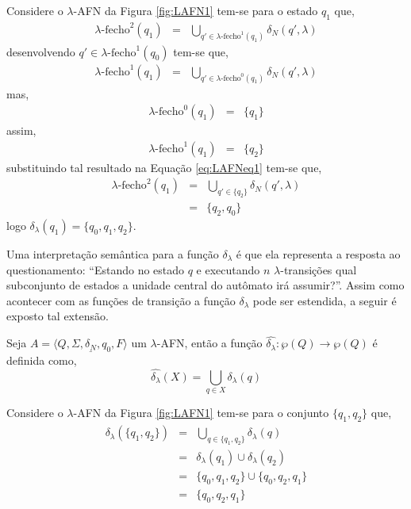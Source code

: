 \begin{example}
	Considere o $\lambda$-AFN da Figura \ref{fig:LAFN1} tem-se para o estado $q_1$ que,
	\begin{eqnarray}\label{eq:LAFNeq1}
		\lambda\text{-fecho}^{2}(q_1) & = &  \bigcup_{q' \in \lambda\text{-fecho}^{1}(q_1)} \delta_N(q', \lambda)
	\end{eqnarray}
	desenvolvendo $q' \in \lambda\text{-fecho}^{1}(q_0)$ tem-se que,
	\begin{eqnarray*}
		\lambda\text{-fecho}^{1}(q_1) & = &  \bigcup_{q' \in \lambda\text{-fecho}^{0}(q_1)} \delta_N(q', \lambda)
	\end{eqnarray*}
	mas, 
	\begin{eqnarray*}
		\lambda\text{-fecho}^{0}(q_1) & = & \{q_1\}
	\end{eqnarray*}
	assim, 
	\begin{eqnarray*}
		\lambda\text{-fecho}^{1}(q_1) & = &  \{q_2\}
	\end{eqnarray*}
	substituindo tal resultado na Equação \ref{eq:LAFNeq1} tem-se que, 
	\begin{eqnarray*}\label{eq:LAFNeq2}
		\lambda\text{-fecho}^{2}(q_1) & = & \bigcup_{q' \in \{q_2\}} \delta_N(q', \lambda)\\
		& = & \{q_2, q_0\}
	\end{eqnarray*}
	logo $\delta_\lambda(q_1) = \{q_0, q_1, q_2\}$.
\end{example}

Uma interpretação semântica para a função $\delta_\lambda$ é que ela representa a resposta ao questionamento: ``Estando no estado $q$ e executando $n$ $\lambda$-transições qual subconjunto de estados a unidade central do autômato irá assumir?''. Assim como acontecer com as funções de transição a função $\delta_\lambda$ pode ser estendida, a seguir é exposto tal extensão.

\begin{definition}\label{def:L-Fecho}
	Seja $A = \langle Q, \Sigma, \underline{\delta_N}, q_0, F\rangle$ um $\lambda$-AFN, então a função $\widehat{\delta_\lambda}: \wp(Q) \rightarrow \wp(Q)$ é definida como,
	\begin{equation}
		\widehat{\delta_\lambda}(X) = \bigcup_{q \in X} \delta_\lambda(q)
	\end{equation}
\end{definition} 

\begin{example}
	Considere o $\lambda$-AFN da Figura \ref{fig:LAFN1} tem-se para o conjunto $\{q_1, q_2\}$ que,
	\begin{eqnarray*}
		\widehat{\delta_\lambda}(\{q_1, q_2\}) & = & \bigcup_{q \in \{q_1, q_2\}} \delta_\lambda(q)\\
		& = & \delta_\lambda(q_1) \cup \delta_\lambda(q_2)\\
		& = & \{q_0, q_1, q_2\} \cup \{q_0, q_2, q_1\}\\
		& = & \{q_0, q_2, q_1\}
	\end{eqnarray*}
\end{example}

